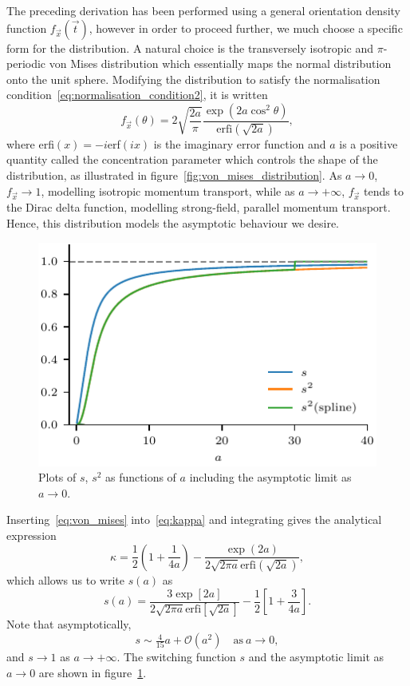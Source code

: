 The preceding derivation has been performed using a general orientation density function $f_\vec{x}(\vec{t})$, however in order to proceed further, we much choose a specific form for the distribution. A natural choice is the transversely isotropic and $\pi$-periodic von Mises distribution which essentially maps the normal distribution onto the unit sphere. Modifying the distribution to satisfy the normalisation condition~\ref{eq:normalisation_condition2}, it is written
\begin{equation}
  \label{eq:von_mises}
f_{\vec{x}}(\theta) = 2 \sqrt{\frac{2a}{\pi}} \frac{\exp(2a \cos^2 \theta)}{\text{erfi}(\sqrt{2a})},
\end{equation}
where erfi$(x) = -i$erf$(ix)$ is the imaginary error function and $a$ is a positive quantity called the concentration parameter which controls the shape of the distribution, as illustrated in figure~\ref{fig:von_mises_distribution}. As $a \to 0$, $f_{\vec{x}} \to 1$, modelling isotropic momentum transport, while as $a \to + \infty$, $f_{\vec{x}}$ tends to the Dirac delta function, modelling strong-field, parallel momentum transport. Hence, this distribution models the asymptotic behaviour we desire.

\begin{figure}[t]
  \centering
  \includegraphics[width=0.5\linewidth]{s_against_a.pdf}
  \caption{Plots of $s$, $s^2$ as functions of $a$ including the asymptotic limit as $a \to 0$.}%
  \label{fig:s_against_a}
\end{figure}

Inserting~\ref{eq:von_mises} into~\ref{eq:kappa} and integrating gives the analytical expression
\begin{equation}
  \label{eq:kappa_analytical}
\kappa = \frac{1}{2} \left( 1 + \frac{1}{4a} \right) - \frac{\exp(2a)}{2 \sqrt{2 \pi a } \text{erfi} ( \sqrt{2 a} )},
\end{equation}
which allows us to write $s(a)$ as 
\begin{equation}
  \label{eq:switching_function_a}
s(a) = \frac{3 \exp[2a]}{2\sqrt{2\pi a} \text{erfi}[\sqrt{2a}]} - \frac{1}{2}\left[ 1 + \frac{3}{4a} \right].
\end{equation}
Note that asymptotically,
\begin{equation}
  \label{eq:asymptotic_s}
s \sim \tfrac{4}{15} a + \mathcal{O}(a^2) \quad \text{as} \ a \to 0,
\end{equation}
and $s \to 1$ as $a \to +\infty$. The switching function $s$ and the asymptotic limit as $a \to 0$ are shown in figure~\ref{fig:s_against_a}.


